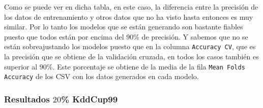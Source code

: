 \documentclass[a4paper, 12pt]{book}
\begin{document}
Como se puede ver en dicha tabla, en este caso, la diferencia entre la precisión de los datos de entrenamiento y otros datos que no ha visto hasta entonces es muy similar. Por lo tanto los modelos que se están generando son bastante fiables puesto que todos están por encima del $90\%$ de precisión. Y sabemos que no se están sobreajustando los modelos puesto que en la columna \texttt{Accuracy CV}, que es la precisión que se obtiene de la validación cruzada, en todos los casos también es superior al $90\%$. Este porcentaje se obtiene de la media de la fila \texttt{Mean Folds Accuracy} de los CSV con los datos generados en cada modelo.

\subsubsection{Resultados $20$\% KddCup99}
\label{subsubsec:kdd_raspberry}
\end{document}
